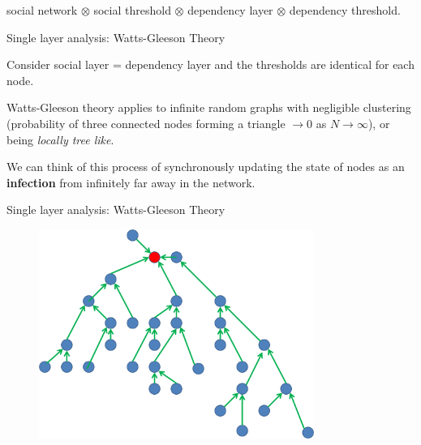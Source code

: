 \documentclass[10pt, xcolor=dvipsnames]{beamer}
\begin{document}
\begin{frame}[standout]
social network $\otimes$ social threshold $\otimes$ dependency layer $\otimes$ dependency threshold.
\end{frame}

\begin{frame}{Single layer analysis: Watts-Gleeson Theory}

Consider social layer = dependency layer and the thresholds are identical for each node.

\pause Watts-Gleeson theory \cite{watts_simple_2002} \cite{gleeson_seed_2007} applies to infinite random graphs with negligible clustering (probability of three connected nodes forming a triangle $\to 0$ as $N \to \infty$), or being \emph{locally tree like}.

\pause We can think of this process of synchronously updating the state of nodes as an \textbf{infection} from infinitely far away in the network.

\end{frame}

\begin{frame}{Single layer analysis: Watts-Gleeson Theory}

\begin{figure}[htb]
\includegraphics[width=0.8\textwidth]{figures/tree.png}
\end{figure}

\end{frame}
\end{document}
